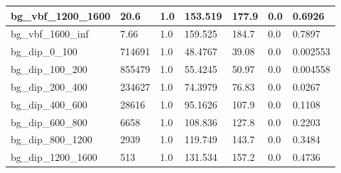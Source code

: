 \documentclass[a4paper, 10pt]{article}
\begin{document}
\begin{table}[H]
\begin{center}
\begin{tabular}{|m{23.0mm}|m{23.0mm}|m{18.0mm}|m{19.0mm}|m{19.0mm}|m{19.0mm}|m{19.0mm}|}
      \hline
      {\cellcolor{white}         bg\_vbf\_1200\_1600}& {\cellcolor{white}         20.6}& {\cellcolor{white}         1.0}& {\cellcolor{white}         153.519}& {\cellcolor{white}         177.9}& {\cellcolor{green}         0.0}& {\cellcolor{green}         0.6926}\\
      \hline
      {\cellcolor{white}         bg\_vbf\_1600\_inf}& {\cellcolor{white}         7.66}& {\cellcolor{white}         1.0}& {\cellcolor{white}         159.525}& {\cellcolor{white}         184.7}& {\cellcolor{green}         0.0}& {\cellcolor{green}         0.7897}\\
      \hline
      {\cellcolor{white}         bg\_dip\_0\_100}& {\cellcolor{white}         714691}& {\cellcolor{white}         1.0}& {\cellcolor{white}         48.4767}& {\cellcolor{white}         39.08}& {\cellcolor{green}         0.0}& {\cellcolor{green}         0.002553}\\
      \hline
      {\cellcolor{white}         bg\_dip\_100\_200}& {\cellcolor{white}         855479}& {\cellcolor{white}         1.0}& {\cellcolor{white}         55.4245}& {\cellcolor{white}         50.97}& {\cellcolor{green}         0.0}& {\cellcolor{green}         0.004558}\\
      \hline
      {\cellcolor{white}         bg\_dip\_200\_400}& {\cellcolor{white}         234627}& {\cellcolor{white}         1.0}& {\cellcolor{white}         74.3979}& {\cellcolor{white}         76.83}& {\cellcolor{green}         0.0}& {\cellcolor{green}         0.0267}\\
      \hline
      {\cellcolor{white}         bg\_dip\_400\_600}& {\cellcolor{white}         28616}& {\cellcolor{white}         1.0}& {\cellcolor{white}         95.1626}& {\cellcolor{white}         107.9}& {\cellcolor{green}         0.0}& {\cellcolor{green}         0.1108}\\
      \hline
      {\cellcolor{white}         bg\_dip\_600\_800}& {\cellcolor{white}         6658}& {\cellcolor{white}         1.0}& {\cellcolor{white}         108.836}& {\cellcolor{white}         127.8}& {\cellcolor{green}         0.0}& {\cellcolor{green}         0.2203}\\
      \hline
      {\cellcolor{white}         bg\_dip\_800\_1200}& {\cellcolor{white}         2939}& {\cellcolor{white}         1.0}& {\cellcolor{white}         119.749}& {\cellcolor{white}         143.7}& {\cellcolor{green}         0.0}& {\cellcolor{green}         0.3484}\\
      \hline
      {\cellcolor{white}         bg\_dip\_1200\_1600}& {\cellcolor{white}         513}& {\cellcolor{white}         1.0}& {\cellcolor{white}         131.534}& {\cellcolor{white}         157.2}& {\cellcolor{green}         0.0}& {\cellcolor{green}         0.4736}\\

\end{tabular}
\end{center}
\end{table}
\end{document}
